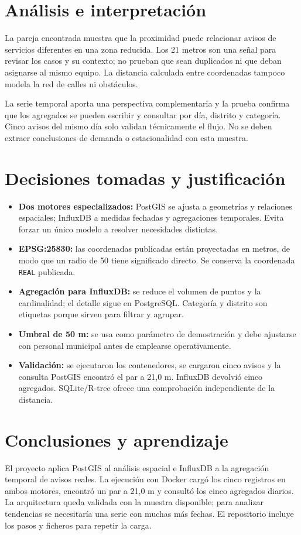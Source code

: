 \documentclass[a4paper,12pt]{article}
\begin{document}
\section{Análisis e interpretación}
La pareja encontrada muestra que la proximidad puede relacionar avisos de servicios diferentes en una zona reducida. Los 21 metros son una señal para revisar los casos y su contexto; no prueban que sean duplicados ni que deban asignarse al mismo equipo. La distancia calculada entre coordenadas tampoco modela la red de calles ni obstáculos.

La serie temporal aporta una perspectiva complementaria y la prueba confirma que los agregados se pueden escribir y consultar por día, distrito y categoría. Cinco avisos del mismo día solo validan técnicamente el flujo. No se deben extraer conclusiones de demanda o estacionalidad con esta muestra.
\section{Decisiones tomadas y justificación}
\begin{itemize}[leftmargin=1.2cm]
\item \textbf{Dos motores especializados:} PostGIS se ajusta a geometrías y relaciones espaciales; InfluxDB a medidas fechadas y agregaciones temporales. Evita forzar un único modelo a resolver necesidades distintas.
\item \textbf{EPSG:25830:} las coordenadas publicadas están proyectadas en metros, de modo que un radio de 50 tiene significado directo. Se conserva la coordenada \texttt{REAL} publicada.
\item \textbf{Agregación para InfluxDB:} se reduce el volumen de puntos y la cardinalidad; el detalle sigue en PostgreSQL. Categoría y distrito son etiquetas porque sirven para filtrar y agrupar.
\item \textbf{Umbral de 50 m:} se usa como parámetro de demostración y debe ajustarse con personal municipal antes de emplearse operativamente.
\item \textbf{Validación:} se ejecutaron los contenedores, se cargaron cinco avisos y la consulta PostGIS encontró el par a 21,0 m. InfluxDB devolvió cinco agregados. SQLite/R-tree ofrece una comprobación independiente de la distancia.
\end{itemize}
\section{Conclusiones y aprendizaje}
El proyecto aplica PostGIS al análisis espacial e InfluxDB a la agregación temporal de avisos reales. La ejecución con Docker cargó los cinco registros en ambos motores, encontró un par a 21,0 m y consultó los cinco agregados diarios. La arquitectura queda validada con la muestra disponible; para analizar tendencias se necesitaría una serie con muchas más fechas. El repositorio incluye los pasos y ficheros para repetir la carga.
\end{document}
